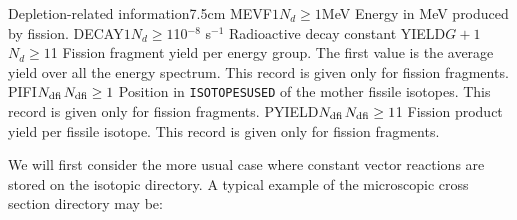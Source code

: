 \begin{DescriptionEnregistrement}{Depletion-related information}{7.5cm}
\label{tabl:tabiso3}
\OptRealEnr
  {MEVF}{$1$}{$N_d \ge 1$}{MeV}
  {Energy in MeV produced by fission.}
\OptRealEnr
  {DECAY}{$1$}{$N_d \ge 1$}{10$^{-8}$ s$^{-1}$}
  {Radioactive decay constant}
\OptRealEnr
  {YIELD}{$G+1$}{$N_d \ge 1$}{1}
  {Fission fragment yield per energy group. The first value is the average yield
  over all the energy spectrum. This record is given only for fission fragments.}
\OptIntEnr
  {PIFI}{$N_{\rm dfi}$}{$N_{\rm dfi} \ge 1$}
  {Position in {\tt ISOTOPESUSED} of the mother fissile isotopes. This record is
  given only for fission fragments.}
\OptRealEnr
  {PYIELD}{$N_{\rm dfi}$}{$N_{\rm dfi} \ge 1$}{1}
  {Fission product yield per fissile isotope. This record is given only for
  fission fragments.}
\end{DescriptionEnregistrement}

\vskip 0.2cm

We will first consider the more usual case where constant vector reactions are
stored on the isotopic directory. A typical example of the microscopic cross
section directory may be:

